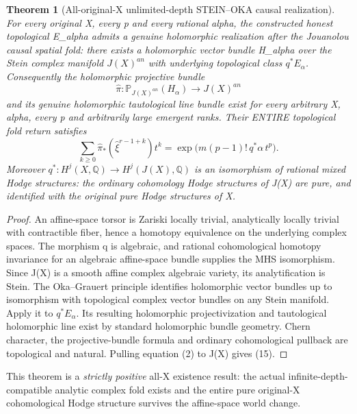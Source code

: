 \documentclass[11pt]{article}
\newtheorem{theorem}{Theorem}
\begin{document}
\begin{theorem}[All-original-X unlimited-depth STEIN--OKA causal realization]
For every original X, every p and every rational alpha,
the constructed honest topological E_alpha admits a
\emph{genuine holomorphic} realization after the
Jouanolou causal spatial fold: there exists a
holomorphic vector bundle H_alpha over the Stein
complex manifold $J(X)^{an}$ with underlying
topological class $q^*E_\alpha$.
Consequently the holomorphic projective bundle
\[
  \widehat\pi:
  \mathbb P_{J(X)^{an}}(H_\alpha)
   \longrightarrow J(X)^{an}                      \tag{14}
\]
and its genuine holomorphic tautological
line bundle exist for every arbitrary X, alpha,
every p and arbitrarily large emergent ranks.
Their ENTIRE topological fold return satisfies
\[
 \boxed{
 \sum_{k\ge0}\widehat\pi_*
   (\widehat\xi^{r-1+k})t^k
   =\exp\bigl(m(p-1)!\,q^*\alpha\,t^p\bigr).
 }                                                        \tag{15}
\]
Moreover $q^*:H^j(X,\mathbb Q)
 \to H^j(J(X),\mathbb Q)$ is an isomorphism
of rational mixed Hodge structures:
the ordinary cohomology Hodge structures of
J(X) are pure, and identified with the
original pure Hodge structures of X.
\end{theorem}
\begin{proof}
An affine-space torsor is Zariski locally
trivial, analytically locally trivial with
contractible fiber, hence a homotopy
equivalence on the underlying complex spaces.
The morphism q is algebraic, and rational
cohomological homotopy invariance for an
algebraic affine-space bundle supplies
the MHS isomorphism.
Since J(X) is a smooth affine complex
algebraic variety, its analytification
is Stein. The Oka--Grauert principle
identifies holomorphic vector bundles
up to isomorphism with topological complex
vector bundles on any Stein manifold.
Apply it to $q^*E_\alpha$. Its resulting
holomorphic projectivization and tautological
holomorphic line exist by standard
holomorphic bundle geometry.
Chern character, the projective-bundle
formula and ordinary cohomological pullback
are topological and natural. Pulling
equation (2) to J(X) gives (15).
\end{proof}

This theorem is a \emph{strictly positive}
all-X existence result: the actual
infinite-depth-compatible analytic complex
fold exists and the entire pure original-X
cohomological Hodge structure survives the
affine-space world change.
\end{document}
